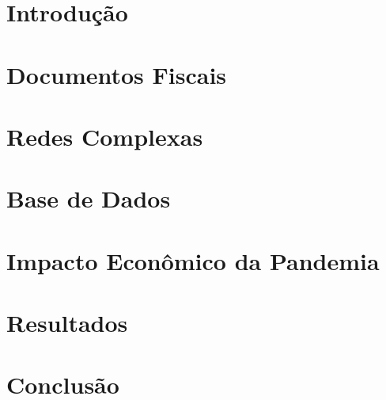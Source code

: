 \documentclass[mestrado, pre-defesa]{packages/icmc}
\begin{document}
\textual

\chapter{Introdução}
\label{chapter:introducao}


\chapter{Documentos Fiscais}
\label{chapter:documenos-fiscais}


\chapter{Redes Complexas}
\label{chapter:redes}


\chapter{Base de Dados}
\label{chapter:base-de-dados}


\chapter{Impacto Econômico da Pandemia}
\label{chapter:impacto-economico}


\chapter{Resultados}
\label{chapter:resultados}


\chapter{Conclusão}
\label{chapter:conclusão}


% 

\postextual


\end{document}
